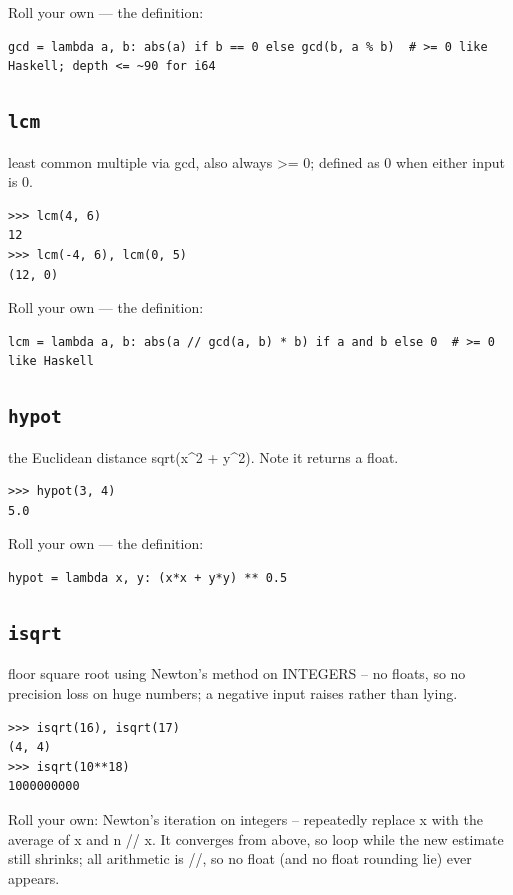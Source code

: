 \documentclass[10pt,letterpaper]{book}
\begin{document}
Roll your own --- the definition:

\begin{lstlisting}[style=ex]
gcd = lambda a, b: abs(a) if b == 0 else gcd(b, a % b)  # >= 0 like Haskell; depth <= ~90 for i64
\end{lstlisting}
\subsection{\texttt{lcm}}\label{def:lcm}
least common multiple via gcd, also always >= 0; defined as 0 when either input is 0.
\begin{lstlisting}[style=ex]
>>> lcm(4, 6)
12
>>> lcm(-4, 6), lcm(0, 5)
(12, 0)
\end{lstlisting}

Roll your own --- the definition:

\begin{lstlisting}[style=ex]
lcm = lambda a, b: abs(a // gcd(a, b) * b) if a and b else 0  # >= 0 like Haskell
\end{lstlisting}
\subsection{\texttt{hypot}}\label{def:hypot}
the Euclidean distance sqrt(x\^{}2 + y\^{}2). Note it returns a float.
\begin{lstlisting}[style=ex]
>>> hypot(3, 4)
5.0
\end{lstlisting}

Roll your own --- the definition:

\begin{lstlisting}[style=ex]
hypot = lambda x, y: (x*x + y*y) ** 0.5
\end{lstlisting}
\subsection{\texttt{isqrt}}\label{def:isqrt}
floor square root using Newton's method on INTEGERS -- no floats, so no precision loss on huge numbers; a negative input raises rather than lying.
\begin{lstlisting}[style=ex]
>>> isqrt(16), isqrt(17)
(4, 4)
>>> isqrt(10**18)
1000000000
\end{lstlisting}

Roll your own: Newton's iteration on integers -- repeatedly replace x with the average of x and n // x. It converges from above, so loop while the new estimate still shrinks; all arithmetic is //, so no float (and no float rounding lie) ever appears.
\end{document}
